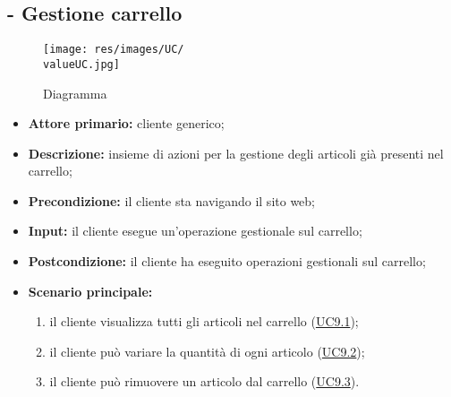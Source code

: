 \subsection{ - Gestione carrello}
\begin{figure}[H]
    \centering
    \texttt{[image: res/images/UC/\\valueUC.jpg]}
    \caption{Diagramma }
\end{figure}
\begin{itemize}
    \item \textbf{Attore primario:} cliente generico;
    \item \textbf{Descrizione:} insieme di azioni per la gestione degli articoli già presenti nel carrello;
    \item \textbf{Precondizione:} il cliente sta navigando il sito web;
    \item \textbf{Input:} il cliente esegue un'operazione gestionale sul carrello;
    \item \textbf{Postcondizione:} il cliente ha eseguito operazioni gestionali sul carrello;
    \item \textbf{Scenario principale:}
          \begin{enumerate}
              \item il cliente visualizza tutti gli articoli nel carrello (\hyperref[UC9.1]{UC9.1});
              \item il cliente può variare la quantità di ogni articolo (\hyperref[UC9.2]{UC9.2});
              \item il cliente può rimuovere un articolo dal carrello (\hyperref[UC9.3]{UC9.3}).
          \end{enumerate}
    
\end{itemize}

\stepsubUserCase
